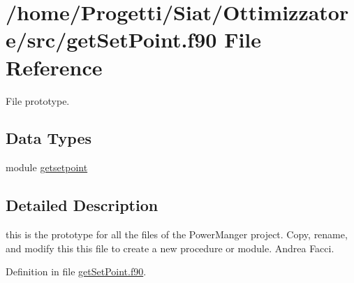 \hypertarget{get_set_point_8f90}{\section{/home/\-Progetti/\-Siat/\-Ottimizzatore/src/get\-Set\-Point.f90 File Reference}
\label{get_set_point_8f90}
}


File prototype.  


\subsection*{Data Types}
\begin{DoxyCompactItemize}
\item 
module \hyperlink{classgetsetpoint}{getsetpoint}
\end{DoxyCompactItemize}


\subsection{Detailed Description}
this is the prototype for all the files of the Power\-Manger project. Copy, rename, and modify this this file to create a new procedure or module.  Andrea Facci. 

Definition in file \hyperlink{get_set_point_8f90_source}{get\-Set\-Point.\-f90}.


